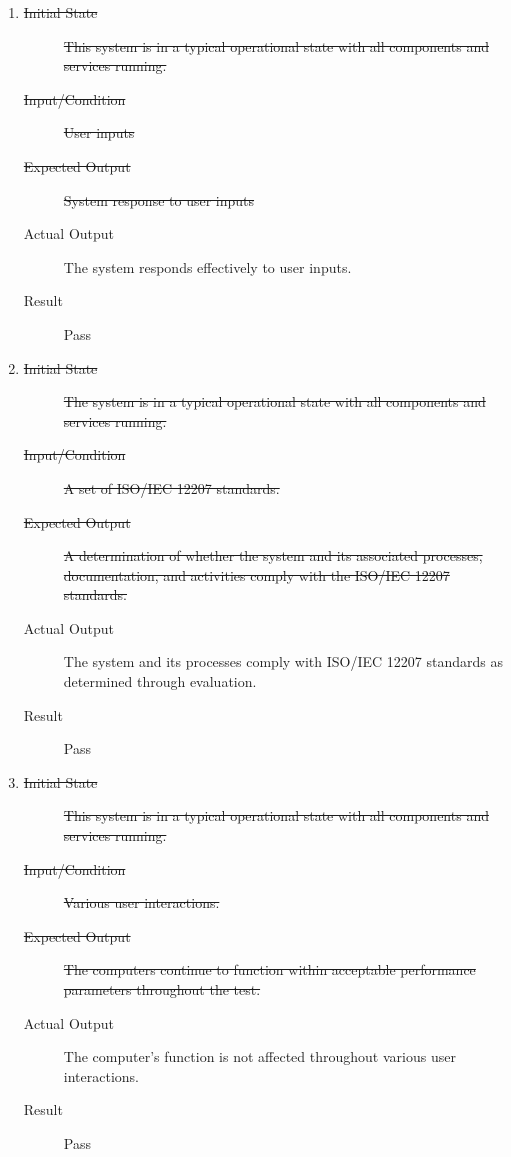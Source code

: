 \documentclass[12pt, titlepage]{article}
\begin{document}
\begin{enumerate}[NFR-T1]
\begin{description}
    \end{description}
  \item \label{NFRT27}
    \begin{description}
    \item[\sout{Initial State}]\sout{ This system is in a typical operational state with all
      components and services running.
    }
		\item[\sout{Input/Condition}]\sout{ User inputs
    }
		\item[\sout{Expected Output}]\sout{ System response to user inputs
    }
		\item[Actual Output] The system responds effectively to user inputs.
    \item[Result] Pass
    \end{description}
  \item \label{NFRT28}
    \begin{description}
    \item[\sout{Initial State}]\sout{ The system is in a typical operational state with all
      components and services running.
    }
		\item[\sout{Input/Condition}]\sout{ A set of ISO/IEC 12207 standards.
    }
		\item[\sout{Expected Output}]\sout{ A determination of whether the system and its associated
      processes, documentation, and activities comply with the ISO/IEC 12207
      standards.
    }
		\item[Actual Output] The system and its processes comply with ISO/IEC 12207
      standards as determined through evaluation.
    \item[Result] Pass
    \end{description}
  \item \label{NFRT29}
    \begin{description}
    \item[\sout{Initial State}]\sout{ This system is in a typical operational state with all
      components and services running.
    }
		\item[\sout{Input/Condition}]\sout{ Various user interactions.
    }
		\item[\sout{Expected Output}]\sout{ The computers continue to function within acceptable
      performance parameters throughout the test.
    }
		\item[Actual Output] The computer's function is not affected throughout various
      user interactions.
    \item[Result] Pass \\

\end{description}
\end{enumerate}
\end{document}
